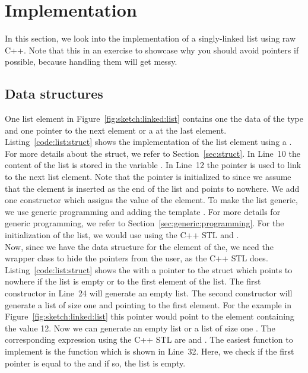 \documentclass[11pt,fleqn]{book} %
\begin{document}
\chapter{Implementation}
In this section, we look into the implementation of a singly-linked list using raw C++. Note that this in an exercise to showcase why you should avoid pointers if possible, because handling them will get messy. 

\section*{Data structures}
One list element in Figure~\ref{fig:sketch:linked:list} contains one the data of the type  and one pointer to the next element or a  at the last element. Listing~\ref{code:list:struct} shows the implementation of the list element using a . For more details about the struct, we refer to Section~\ref{sec:struct}. In Line~10 the content of the list is stored in the variable . In Line~12 the pointer  is used to link to the next list element. Note that the pointer is initialized to  since we assume that the element is inserted as the end of the list and points to nowhere. We add one constructor which assigns the value of the element. To make the list generic, we use generic programming and adding the template . For more details for generic programming, we refer to Section~\ref{sec:generic:programming}. For the initialization of the list, we would use  using the C++ STL and .\\

Now, since we have the data structure for the element of the, we need the wrapper class to hide the pointers from the user, as the C++ STL does. Listing~\ref{code:list:struct} shows the  with a pointer to the struct  which points to nowhere  if the list is empty or to the first element of the list. The first constructor in Line~24 will generate an empty list. The second constructor will generate a list of size one and pointing to the first element. For the example in Figure~\ref{fig:sketch:linked:list} this pointer would point to the element containing the value 12. Now we can generate an empty list  or a list of size one . The corresponding expression using the C++ STL are  and . The easiest function to implement is the  function which is shown in Line~32. Here, we check if the first pointer is equal to the  and if so, the list is empty. 
\end{document}
